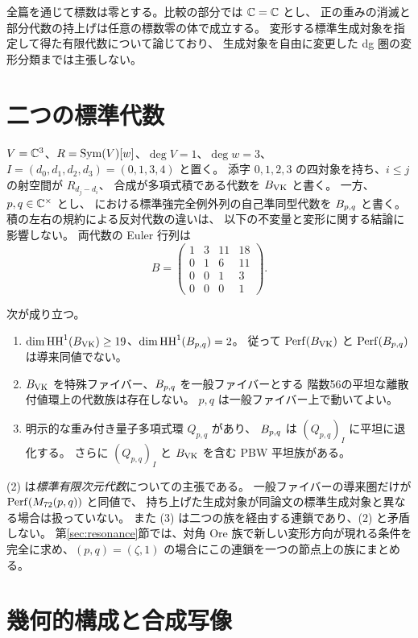 全篇を通じて標数は零とする。比較の部分では $\mathbb C=\mathbb C$ とし、
正の重みの消滅と部分代数の持上げは任意の標数零の体で成立する。
変形する標準生成対象を指定して得た有限代数について論じており、
生成対象を自由に変更した dg 圏の変形分類までは主張しない。
\section{二つの標準代数}
$V=\mathbb C^3$、$R=\operatorname{Sym}(V)[w]$、$\deg V=1$、$\deg w=3$、
$I=(d_0,d_1,d_2,d_3)=(0,1,3,4)$ と置く。
添字 $0,1,2,3$ の四対象を持ち、$i\le j$ の射空間が $R_{d_j-d_i}$、
合成が多項式積である代数を $B_{\mathrm{VK}}$ と書く。
一方、$p,q\in\mathbb C^\times$ とし、\cite[Theorem 6.1]{LO} における標準強完全例外列の自己準同型代数を
$B_{p,q}$ と書く。積の左右の規約による反対代数の違いは、
以下の不変量と変形に関する結論に影響しない。
両代数の Euler 行列は
\begin{equation}\label{eq:euler}
B=\begin{pmatrix}1&3&11&18\\0&1&6&11\\0&0&1&3\\0&0&0&1\end{pmatrix}.
\end{equation}

\begin{theorem}[比較結果の要約]\label{thm:summary}
次が成り立つ。
\begin{enumerate}[label=(\arabic*)]
\item $\dim\operatorname{HH}^1(B_{\mathrm{VK}})\ge19$、$\dim\operatorname{HH}^1(B_{p,q})=2$。
従って $\operatorname{Perf}(B_{\mathrm{VK}})$ と $\operatorname{Perf}(B_{p,q})$ は導来同値でない。
\item $B_{\mathrm{VK}}$ を特殊ファイバー、$B_{p,q}$ を一般ファイバーとする
階数56の平坦な離散付値環上の代数族は存在しない。
$p,q$ は一般ファイバー上で動いてよい。
\item 明示的な重み付き量子多項式環 $Q_{p,q}$ があり、
$B_{p,q}$ は $(Q_{p,q})_I$ に平坦に退化する。
さらに $(Q_{p,q})_I$ と $B_{\mathrm{VK}}$ を含む PBW 平坦族がある。
\end{enumerate}
\end{theorem}

(2) は\emph{標準有限次元代数}についての主張である。
一般ファイバーの導来圏だけが $\operatorname{Perf}(M_{72}(p,q))$ と同値で、
持ち上げた生成対象が同論文の標準生成対象と異なる場合は扱っていない。
また (3) は二つの族を経由する連鎖であり、(2) と矛盾しない。
第\ref{sec:resonance}節では、対角 Ore 族で新しい変形方向が現れる条件を
完全に求め、$(p,q)=(\zeta,1)$ の場合にこの連鎖を一つの節点上の族にまとめる。

\section{幾何的構成と合成写像}
